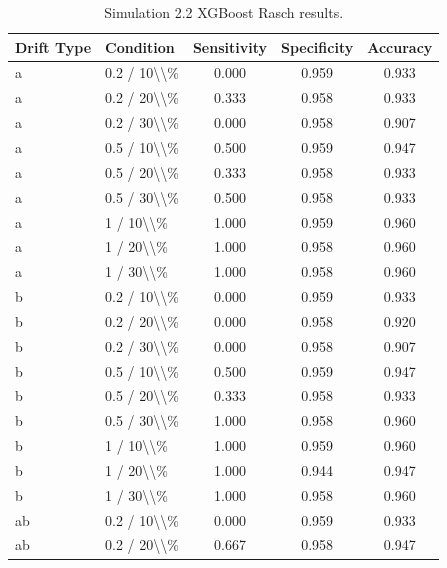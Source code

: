 \begin{table}[!h]
\centering
\caption{\label{tab:tab:sim22_xgb_rasch}Simulation 2.2 XGBoost Rasch results.}
\centering
\begin{tabular}[t]{llccc}
\toprule
Drift Type & Condition & Sensitivity & Specificity & Accuracy\\
\midrule
a & 0.2 / 10\textbackslash{}\textbackslash{}\% & 0.000 & 0.959 & 0.933\\
a & 0.2 / 20\textbackslash{}\textbackslash{}\% & 0.333 & 0.958 & 0.933\\
a & 0.2 / 30\textbackslash{}\textbackslash{}\% & 0.000 & 0.958 & 0.907\\
a & 0.5 / 10\textbackslash{}\textbackslash{}\% & 0.500 & 0.959 & 0.947\\
a & 0.5 / 20\textbackslash{}\textbackslash{}\% & 0.333 & 0.958 & 0.933\\
\addlinespace
a & 0.5 / 30\textbackslash{}\textbackslash{}\% & 0.500 & 0.958 & 0.933\\
a & 1 / 10\textbackslash{}\textbackslash{}\% & 1.000 & 0.959 & 0.960\\
a & 1 / 20\textbackslash{}\textbackslash{}\% & 1.000 & 0.958 & 0.960\\
a & 1 / 30\textbackslash{}\textbackslash{}\% & 1.000 & 0.958 & 0.960\\
b & 0.2 / 10\textbackslash{}\textbackslash{}\% & 0.000 & 0.959 & 0.933\\
\addlinespace
b & 0.2 / 20\textbackslash{}\textbackslash{}\% & 0.000 & 0.958 & 0.920\\
b & 0.2 / 30\textbackslash{}\textbackslash{}\% & 0.000 & 0.958 & 0.907\\
b & 0.5 / 10\textbackslash{}\textbackslash{}\% & 0.500 & 0.959 & 0.947\\
b & 0.5 / 20\textbackslash{}\textbackslash{}\% & 0.333 & 0.958 & 0.933\\
b & 0.5 / 30\textbackslash{}\textbackslash{}\% & 1.000 & 0.958 & 0.960\\
\addlinespace
b & 1 / 10\textbackslash{}\textbackslash{}\% & 1.000 & 0.959 & 0.960\\
b & 1 / 20\textbackslash{}\textbackslash{}\% & 1.000 & 0.944 & 0.947\\
b & 1 / 30\textbackslash{}\textbackslash{}\% & 1.000 & 0.958 & 0.960\\
ab & 0.2 / 10\textbackslash{}\textbackslash{}\% & 0.000 & 0.959 & 0.933\\
ab & 0.2 / 20\textbackslash{}\textbackslash{}\% & 0.667 & 0.958 & 0.947\\

\end{tabular}
\end{table}
